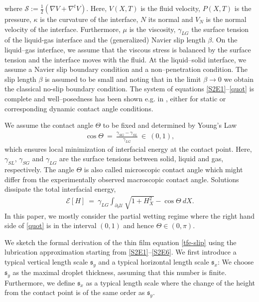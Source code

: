 \documentclass[pagesize,pdftex]{amsart}
\newcommand{\p}{\partial}
\newcommand{\EE}{{\mathcal E}}
\renewcommand{\SS}{{\mathcal S}}
\newcommand{\UU}{{\mathcal U}}
\newcommand{\bet}{\beta}
\newcommand{\gam}{\gamma}
\newcommand{\kap}{\kappa}
\newcommand{\LAM}{{\mathfrak s}}
\begin{document}
where $\SS := \frac 12 (\nabla V + \nabla^t V)$. Here, $V(X,T)$ is the fluid
velocity, $P(X,T)$ is the pressure, $\kap$ is the curvature of the interface,
$N$ its normal and $V_N$ is the normal velocity of the interface. Furthermore,
$\mu$ is the viscosity, $\gam_{LG}$ the surface tension of the liquid-gas
interface and the (generalized) Navier slip length $\bet$. On the liquid--gas
interface, we assume that the viscous stress is balanced by the surface tension
and the interface moves with the fluid. At the liquid--solid interface, we
assume a Navier slip boundary condition and a non--penetration condition. The
slip length $\bet$ is assumed to be small and noting that in the limit
$\bet \to 0$ we obtain the classical no-slip boundary condition. The system of
equations \eqref{S2E1}--\eqref{quot} is complete and well--posedness has been
shown e.g. in \cite{GuoTice-2018,LeoniTice-2023,BGKMRS-2024b}, either
for static or corresponding dynamic contact angle conditions.

\medskip

We assume the contact angle $\Theta$ to be fixed and determined by Young's Law
\begin{align} \label{quot} %
  \cos \Theta \ %
  = \ \frac{\gam_{SG}-\gam_{SL}}{\gam_{LG}} \ \in \ (0,1), %
\end{align}
which ensures local minimization of interfacial energy at the contact
point. Here, $\gam_{SL}$, $\gam_{SG}$ and $\gam_{LG}$ are the surface tensions
between solid, liquid and gas, respectively. The angle $\Theta$ is also called
microscopic contact angle which might differ from the experimentally observed
macroscopic contact angle. Solutions dissipate the total interfacial energy,
\begin{align} \label{energy-init} %
  \EE[H] \ %
  = \ \gam_{LG} \int_{\p_0 \UU} \sqrt{1+H_{X}^2} -\cos \Theta \ dX.
\end{align}
In this paper, we mostly consider the partial wetting regime where the right
hand side of \eqref{quot} is in the interval $(0,1)$ and hence
$\Theta \in (0,\pi)$.

We sketch the formal derivation of the thin film equation \eqref{tfe-slip} using
the lubrication approximation starting from \eqref {S2E1}--\eqref{S2E6}. We
first introduce a typical vertical length scale $\LAM_y$ and a typical
horizontal length scale $\LAM_x$: We choose $\LAM_y$ as the maximal droplet
thickness, assuming that this number is finite. Furthermore, we define $\LAM_x$
as a typical length scale where the change of the height from the contact point
is of the same order as $\LAM_y$.
\end{document}
